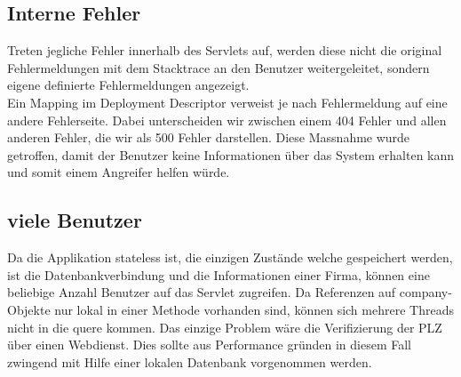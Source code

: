 \documentclass[12pt]{scrartcl}
\begin{document}
\subsection{Interne Fehler}
Treten jegliche Fehler innerhalb des Servlets auf, werden diese nicht die original Fehlermeldungen mit dem Stacktrace an den Benutzer weitergeleitet, sondern eigene definierte Fehlermeldungen angezeigt.\\
Ein Mapping im Deployment Descriptor verweist je nach Fehlermeldung auf eine andere Fehlerseite. Dabei unterscheiden wir zwischen einem 404 Fehler und allen anderen Fehler, die wir als 500 Fehler darstellen. Diese Massnahme wurde getroffen, damit der Benutzer keine Informationen über das System erhalten kann und somit einem Angreifer helfen würde.

\subsection{viele Benutzer}
Da die Applikation stateless ist, die einzigen Zustände welche gespeichert werden, ist die Datenbankverbindung und die Informationen einer Firma, können eine beliebige Anzahl Benutzer auf das Servlet zugreifen. Da Referenzen auf company-Objekte nur lokal in einer Methode vorhanden sind, können sich mehrere Threads nicht in die quere kommen. Das einzige Problem wäre die Verifizierung der PLZ über einen Webdienst. Dies sollte aus Performance gründen in diesem Fall zwingend mit Hilfe einer lokalen Datenbank vorgenommen werden.
\end{document}
